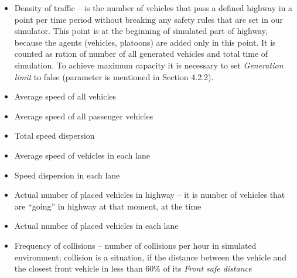 \begin{itemize}
\item Density of traffic – is the number of vehicles that pass a defined highway in a point per time period without breaking any safety rules that are set in our simulator. This point is at the beginning of simulated part of highway, because the agents (vehicles, platoons) are added only in this point. It is counted as ration of number of all generated vehicles and total time of simulation. To achieve maximum capacity it is necessary to set \textit{Generation limit} to false (parameter is mentioned in Section 4.2.2).
\item Average speed of all vehicles 
\item Average speed of all passenger vehicles
\item Total speed dispersion
\item Average speed of vehicles in each lane
\item Speed dispersion in each lane
\item Actual number of placed vehicles in highway – it is number of vehicles that are “going” in highway at that moment, at the time
\item Actual number of placed vehicles in each lane
\item Frequency of collisions – number of collisions per hour in simulated environment; collision is a situation, if the distance between the vehicle and the  closest front vehicle in less than 60\% of its \textit{Front safe distance} 
\end{itemize}

